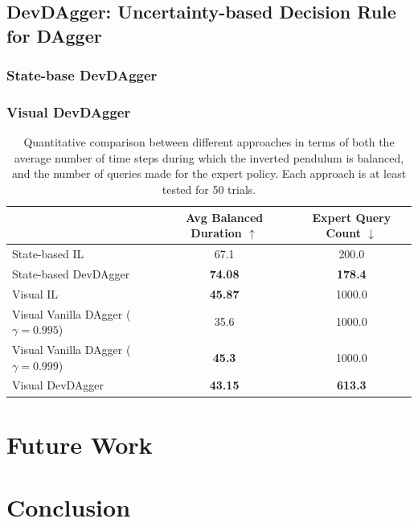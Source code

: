 \documentclass[11pt, reqno, letterpaper, twoside]{amsart}
\begin{document}
\subsection{DevDAgger: Uncertainty-based Decision Rule for DAgger}

\subsubsection{State-base DevDAgger}

\subsubsection{Visual DevDAgger}

\begin{table}[ht]
	\centering
	\begin{tabular}{|l|c|c|}
		\hline
		                                         & Avg Balanced Duration $\uparrow$ & Expert Query Count $\downarrow$ \\
		\hline
		State-based IL                           & 67.1                             & 200.0                           \\
		\hline
		State-based DevDAgger                    & \textbf{74.08}                   & \textbf{178.4}                  \\
		\hhline{|=|=|=|}
		Visual IL                                & \textbf{45.87}                   & 1000.0                          \\
		\hline
		Visual Vanilla DAgger ($\gamma = 0.995$) & 35.6                             & 1000.0                          \\
		\hline
		Visual Vanilla DAgger ($\gamma = 0.999$) & \textbf{45.3}                    & 1000.0                          \\
		\hline
		Visual DevDAgger                         & \textbf{43.15}                   & \textbf{613.3}                  \\
		\hline
	\end{tabular}
	\caption{Quantitative comparison between different approaches in terms of both the average number of time steps during which the inverted pendulum is balanced, and the number of queries made for the expert policy. Each approach is at least tested for 50 trials.}
	\label{tab:comparison}
\end{table}

\section{Future Work}

\section{Conclusion}

 {
  
  
 }
\end{document}
